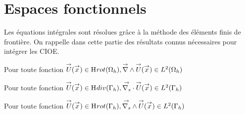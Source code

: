 \section{Espaces fonctionnels}
  Les équations intégrales sont résolues grâce à la méthode des éléments finis de frontière. On rappelle dans cette partie des résultats connus nécessaires pour intégrer les CIOE.

  \begin{defn}
    Pour toute fonction \(\vect{U}(\vx) \in \Hrot(\OO_h), \vrot \vect{U}(\vx) \in L^2(\OO_h)\)

    Pour toute fonction \(\vect{U}(\vx) \in \Hdiv(\Gamma_h), \vdivs\vect{U}(\vx) \in L^2(\Gamma_h)\)

    Pour toute fonction \(\vect{U}(\vx) \in \Hrot(\Gamma_h), \vrots\vect{U}(\vx) \in L^2(\Gamma_h)\)
  \end{defn}